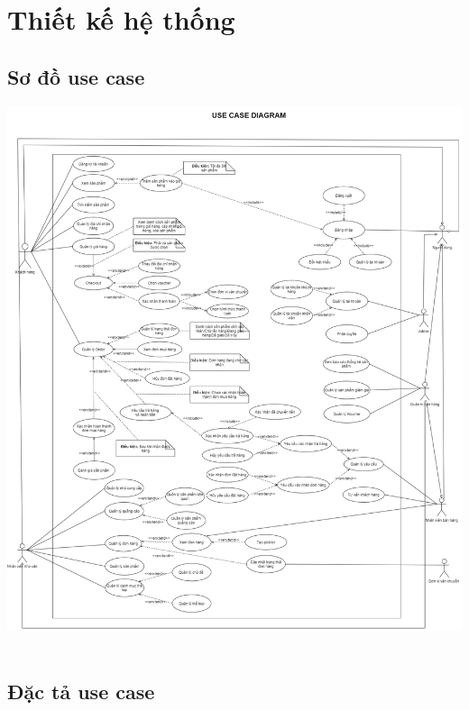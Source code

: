 \documentclass[12pt,a4paper,2sides]{report}
\begin{document}
\section{Thiết kế hệ thống}
\subsection{Sơ đồ use case}
	\includegraphics[width=1\linewidth]{lib/usecase/usecasediagram.png}\\\vspace*{1cm}
	\hspace{5cm}{Hình 1. Sơ đồ use case}\\
\subsection{Đặc tả use case}
\end{document}
